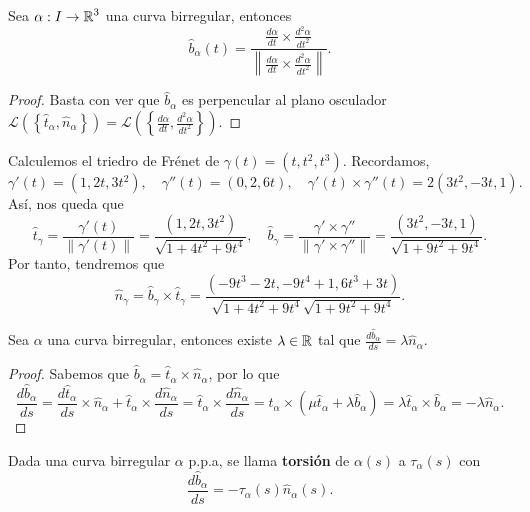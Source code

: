 \begin{prop} Sea $\displaystyle \alpha : I \to \mathbb{R}^{3} $ una curva birregular, entonces
\[\hat{b}_{\alpha }\left(t\right)=\frac{\frac{d\alpha }{dt}\times \frac{d^{2}\alpha }{dt ^{2}}}{\left\|\frac{d\alpha }{dt} \times \frac{d^{2}\alpha }{dt ^{2}}\right\|} .\]
\end{prop}
\begin{proof}
	Basta con ver que $\displaystyle \hat{b}_{\alpha} $ es perpencular al plano osculador $\displaystyle \mathcal{L}\left(\left\{\hat{t}_{\alpha}, \hat{n}_{\alpha}\right\}\right)=\mathcal{L}\left(\left\{\frac{d\alpha }{dt}, \frac{d^{2}\alpha }{dt ^{2}}\right\}\right) $.
\end{proof}
\begin{eg}
Calculemos el triedro de Frénet de $\displaystyle \gamma\left(t\right)=\left(t, t ^{2}, t ^{3}\right) $. Recordamos,
\[\gamma'\left(t\right)=\left(1, 2t, 3t ^{2}\right), \quad \gamma''\left(t\right)=\left(0,2,6t\right), \quad \gamma'\left(t\right)\times\gamma''\left(t\right)=2\left(3t ^{2}, - 3t, 1\right) .\]
Así, nos queda que 
\[\hat{t}_{\gamma }=\frac{\gamma'\left(t\right)}{\|\gamma'\left(t\right)\|}=\frac{\left(1,2t,3t ^{2}\right)}{\sqrt{1 + 4t ^{2} + 9t ^{4}}}, \quad \hat{b}_{\gamma }=\frac{\gamma' \times \gamma''}{\|\gamma'\times\gamma''\|}=\frac{\left(3t ^{2}, -3t, 1\right)}{\sqrt{1 + 9t ^{2} + 9t ^{4}}} .\]
Por tanto, tendremos que 
\[\hat{n}_{\gamma }=\hat{b}_{\gamma}\times\hat{t}_{\gamma}=\frac{\left(-9t ^{3}-2t, -9t ^{4}+1, 6t ^{3}+3t\right)}{\sqrt{1 + 4t ^{2} + 9t ^{4}}\sqrt{1 + 9t ^{2} + 9t ^{4}}} .\]
\end{eg}
\begin{lema}
Sea $\displaystyle \alpha  $ una curva birregular, entonces existe $\displaystyle \lambda \in \mathbb{R} $ tal que $\displaystyle \frac{d\hat{b}_{\alpha }}{d s}=\lambda \hat{n}_{\alpha } $.
\end{lema}
\begin{proof}
Sabemos que $\displaystyle \hat{b}_{\alpha }=\hat{t}_{\alpha }\times\hat{n}_{\alpha } $, por lo que 
\[\frac{d\hat{b}_{\alpha }}{d s}=\frac{d\hat{t}_{\alpha }}{d s} \times \hat{n}_{\alpha } + \hat{t}_{\alpha }\times \frac{d\hat{n}_{\alpha }}{d s}=\hat{t}_{\alpha}\times\frac{d\hat{n}_{\alpha }}{d s}=\hat{t}_{\alpha } \times\left(\mu\hat{t}_{\alpha }+ \lambda \hat{b}_{\alpha }\right)=\lambda\hat{t}_{\alpha }\times\hat{b}_{\alpha }=-\lambda\hat{n}_{\alpha } .\]
\end{proof}
\begin{definition}[Torsión]
Dada una curva birregular $\displaystyle \alpha  $ p.p.a, se llama \textbf{torsión} de $\displaystyle \alpha\left(s\right) $ a $\displaystyle \tau_{\alpha }\left(s\right) $ con
\[\frac{d\hat{b}_{\alpha }}{d s}=-\tau_{\alpha }\left(s\right)\hat{n}_{\alpha }\left(s\right) .\]
\end{definition}
